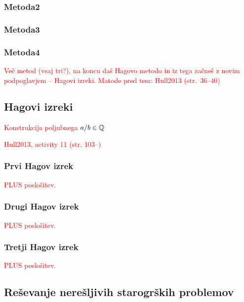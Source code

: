 \subsubsection*{Metoda2}

\subsubsection*{Metoda3}

\subsubsection*{Metoda4}

\textcolor{red}{Več metod (vsaj tri?), na koncu daš Hagovo metodo in iz tega začneš z novim podpoglavjem -- Hagovi izreki. Matode pred tem: Hull2013 (str.\ 36--40)}


\subsection{Hagovi izreki}

\textcolor{red}{Konstrukcija poljubnega $a/b \in \mathbb Q$~\cite[str.\ 20--21]{lang2013}}

\textcolor{red}{Hull2013, activity 11 (str. 103--)}

\subsubsection{Prvi Hagov izrek}

\textcolor{red}{PLUS poslošitev.}

\subsubsection{Drugi Hagov izrek}

\textcolor{red}{PLUS poslošitev.}

\subsubsection{Tretji Hagov izrek}

\textcolor{red}{PLUS poslošitev.}





\subsection{Reševanje nerešljivih starogrških problemov}
\label{podpogl:starogrskiproblemi}

